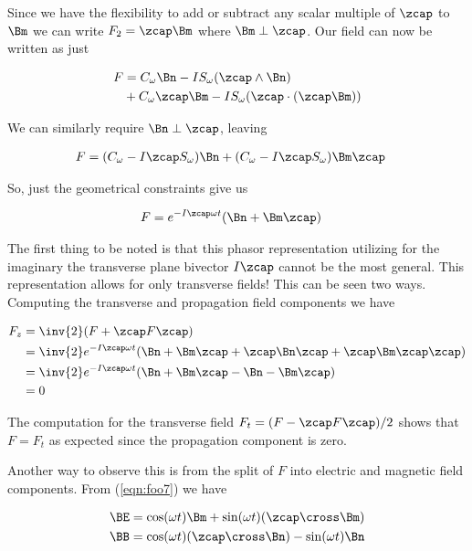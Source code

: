 Since we have the flexibility to add or subtract any scalar multiple of $\zcap$ to $\Bm$ we can write $F_2 = \zcap \Bm$ where $\Bm \perp \zcap$.  Our field can now be written as just

\begin{align*}
F &= 
 C_\omega \Bn - I S_\omega (\zcap \wedge \Bn)  \\
&+ C_\omega \zcap \Bm - I S_\omega (\zcap \cdot (\zcap \Bm)) \\
\end{align*}

We can similarly require $\Bn \perp \zcap$, leaving

\begin{align}\label{eqn:foo7}
F &= (C_\omega - I \zcap S_\omega ) \Bn  + (C_\omega - I \zcap S_\omega) \Bm \zcap
\end{align}

So, just the geometrical constraints give us

\begin{align}\label{eqn:foo6}
F &= e^{-I\zcap \omega t}(\Bn + \Bm \zcap)
\end{align}

The first thing to be noted is that this phasor representation utilizing for the imaginary the transverse plane bivector $I\zcap$ cannot be the most general.  This representation allows for only transverse fields!  This can be seen two ways.  Computing the transverse and propagation field components we have

\begin{align*}
F_z 
&= \inv{2}(F + \zcap F \zcap) \\
&= 
\inv{2} e^{-I\zcap \omega t}( \Bn + \Bm \zcap + \zcap \Bn \zcap + \zcap \Bm \zcap \zcap) \\
&= 
\inv{2} e^{-I\zcap \omega t}( \Bn + \Bm \zcap - \Bn - \Bm \zcap ) \\
&= 0
\end{align*}

The computation for the transverse field $F_t = (F - \zcap F \zcap)/2$ shows that $F = F_t$ as expected since the propagation component is zero.

Another way to observe this is from the split of $F$ into electric and magnetic field components.  From (\ref{eqn:foo7}) we have

\begin{align}\label{eqn:foo8}
\BE &= \cos(\omega t) \Bm + \sin(\omega t) (\zcap \cross \Bm) \\
\BB &= \cos(\omega t) (\zcap \cross \Bn) - \sin(\omega t) \Bn
\end{align}

